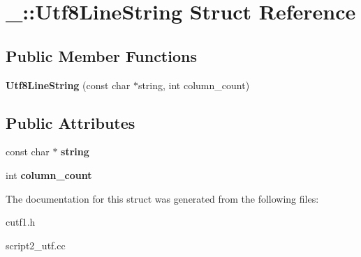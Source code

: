 \hypertarget{struct___1_1_utf8_line_string}{}\section{\+\_\+\+:\+:Utf8\+Line\+String Struct Reference}
\label{struct___1_1_utf8_line_string}
\subsection*{Public Member Functions}
\begin{DoxyCompactItemize}
\item 
\mbox{\label{struct___1_1_utf8_line_string_af4dab13dfcf255845a8ac126282c19c9}} 
{\bfseries Utf8\+Line\+String} (const char $\ast$string, int column\+\_\+count)
\end{DoxyCompactItemize}
\subsection*{Public Attributes}
\begin{DoxyCompactItemize}
\item 
\mbox{\label{struct___1_1_utf8_line_string_a4dcedf89e8915275029abad2d8131a7b}} 
const char $\ast$ {\bfseries string}
\item 
\mbox{\label{struct___1_1_utf8_line_string_a1adeae247199eed43cd3e273c817b343}} 
int {\bfseries column\+\_\+count}
\end{DoxyCompactItemize}


The documentation for this struct was generated from the following files\+:\begin{DoxyCompactItemize}
\item 
cutf1.\+h\item 
script2\+\_\+utf.\+cc\end{DoxyCompactItemize}
